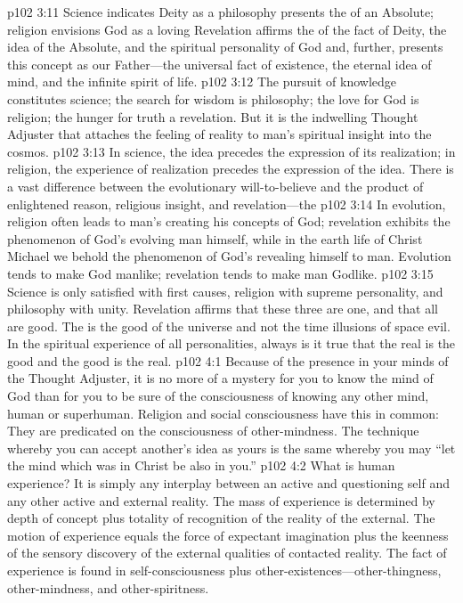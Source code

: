 \vs p102 3:11 Science indicates Deity as a  philosophy presents the  of an Absolute; religion envisions God as a loving  Revelation affirms the  of the fact of Deity, the idea of the Absolute, and the spiritual personality of God and, further, presents this concept as our Father---the universal fact of existence, the eternal idea of mind, and the infinite spirit of life.
\vs p102 3:12 The pursuit of knowledge constitutes science; the search for wisdom is philosophy; the love for God is religion; the hunger for truth  a revelation. But it is the indwelling Thought Adjuster that attaches the feeling of reality to man’s spiritual insight into the cosmos.
\pc \vs p102 3:13 In science, the idea precedes the expression of its realization; in religion, the experience of realization precedes the expression of the idea. There is a vast difference between the evolutionary will\hyp{}to\hyp{}believe and the product of enlightened reason, religious insight, and revelation---the \plusone
\vs p102 3:14 In evolution, religion often leads to man’s creating his concepts of God; revelation exhibits the phenomenon of God’s evolving man himself, while in the earth life of Christ Michael we behold the phenomenon of God’s revealing himself to man. Evolution tends to make God manlike; revelation tends to make man Godlike.
\vs p102 3:15 Science is only satisfied with first causes, religion with supreme personality, and philosophy with unity. Revelation affirms that these three are one, and that all are good. The  is the good of the universe and not the time illusions of space evil. In the spiritual experience of all personalities, always is it true that the real is the good and the good is the real.
\vs p102 4:1 Because of the presence in your minds of the Thought Adjuster, it is no more of a mystery for you to know the mind of God than for you to be sure of the consciousness of knowing any other mind, human or superhuman. Religion and social consciousness have this in common: They are predicated on the consciousness of other\hyp{}mindness. The technique whereby you can accept another’s idea as yours is the same whereby you may “let the mind which was in Christ be also in you.”
\vs p102 4:2 What is human experience? It is simply any interplay between an active and questioning self and any other active and external reality. The mass of experience is determined by depth of concept plus totality of recognition of the reality of the external. The motion of experience equals the force of expectant imagination plus the keenness of the sensory discovery of the external qualities of contacted reality. The fact of experience is found in self\hyp{}consciousness plus other\hyp{}existences---other\hyp{}thingness, other\hyp{}mindness, and other\hyp{}spiritness.
